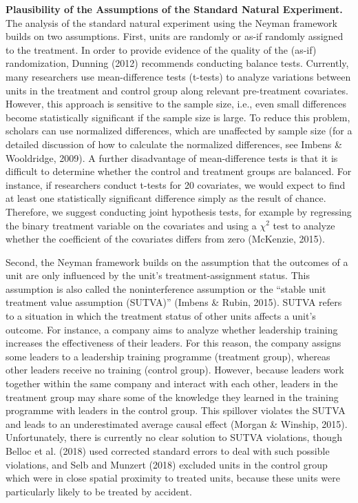 \documentclass[english]{article}
\begin{document}
\noindent \textbf{Plausibility of the Assumptions of the Standard Natural Experiment.}
The analysis of the standard natural experiment using the Neyman
framework builds on two assumptions. First, units are randomly or as-if
randomly assigned to the treatment. In order to provide evidence of the
quality of the (as-if) randomization, Dunning (2012) recommends
conducting balance tests. Currently, many researchers use
mean-difference tests (t-tests) to analyze variations between units in
the treatment and control group along relevant pre-treatment covariates.
However, this approach is sensitive to the sample size, i.e., even small
differences become statistically significant if the sample size is
large. To reduce this problem, scholars can use normalized differences,
which are unaffected by sample size (for a detailed discussion of how to
calculate the normalized differences, see Imbens \& Wooldridge, 2009). A
further disadvantage of mean-difference tests is that it is difficult to
determine whether the control and treatment groups are balanced. For
instance, if researchers conduct t-tests for 20 covariates, we would
expect to find at least one statistically significant difference simply
as the result of chance. Therefore, we suggest conducting joint
hypothesis tests, for example by regressing the binary treatment
variable on the covariates and using a $\chi^{2}$ test to
analyze whether the coefficient of the covariates differs from zero
(McKenzie, 2015).

Second, the Neyman framework builds on the assumption that the outcomes
of a unit are only influenced by the unit's treatment-assignment status.
This assumption is also called the noninterference assumption or the
``stable unit treatment value assumption (SUTVA)'' (Imbens \& Rubin,
2015). SUTVA refers to a situation in which the treatment status of
other units affects a unit's outcome. For instance, a company aims to
analyze whether leadership training increases the effectiveness of their
leaders. For this reason, the company assigns some leaders to a
leadership training programme (treatment group), whereas other leaders
receive no training (control group). However, because leaders work
together within the same company and interact with each other, leaders
in the treatment group may share some of the knowledge they learned in
the training programme with leaders in the control group. This spillover
violates the SUTVA and leads to an underestimated average causal effect
(Morgan \& Winship, 2015). Unfortunately, there is currently no clear
solution to SUTVA violations, though Belloc et al. (2018) used corrected
standard errors to deal with such possible violations, and Selb and
Munzert (2018) excluded units in the control group which were in close
spatial proximity to treated units, because these units were
particularly likely to be treated by accident.
\end{document}
